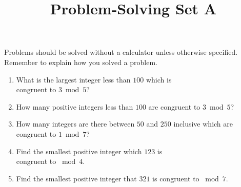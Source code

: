 \documentclass{article}
\title{Problem-Solving Set A}
\author{}
\date{}
\begin{document}
\maketitle
\noindent Problems should be solved without a calculator unless otherwise specified.
Remember to explain how you solved a problem.
\begin{multicols}{2}
    \begin{enumerate}
        \item What is the largest integer less than $100$ which is \\ congruent to $3\bmod 5$?
        \vspace{3cm}
        \item How many positive integers less than $100$ are congruent to $3\bmod 5$?
        \vspace{3cm}
        \item How many integers are there between $50$ and $250$ inclusive which are congruent to $1\bmod 7$?
        \vspace{3cm}
        \columnbreak
        \item Find the smallest positive integer which $123$ is \\ congruent to $\bmod 4$.
        \vspace{3cm}
        \item Find the smallest positive integer that $321$ is congruent to $\bmod 7$.
        \vspace{3cm}
    \end{enumerate}
\end{multicols}
\end{document}
